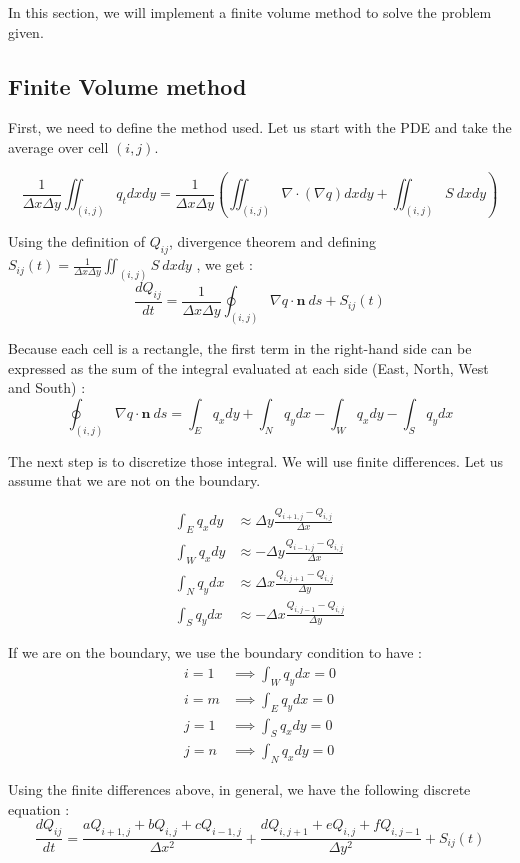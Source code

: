 In this section, we will implement a finite volume method to solve the problem given.

\subsection{Finite Volume method}
First, we need to define the method used. Let us start with the PDE and take the average over cell $(i,j)$.

$$\frac{1}{\Delta x \Delta y}\iint_{(i,j)} q_t dxdy = \frac{1}{\Delta x \Delta y} (\iint_{(i,j)} \nabla \cdot (\nabla q)dxdy + \iint_{(i,j)} S\: dxdy) $$

Using the definition of $Q_{ij}$, divergence theorem and defining $S_{ij}(t) =\frac{1}{\Delta x \Delta y}\iint_{(i,j)} S\: dxdy$ , we get :
$$\frac{dQ_{ij}}{dt} = \frac{1}{\Delta x \Delta y}\oint_{(i,j)} \nabla q \cdot \textbf{n}\: ds + S_{ij}(t)$$

Because each cell is a rectangle, the first term in the right-hand side can be expressed as the sum of the integral evaluated at each side (East, North, West and South) : 
$$\oint_{(i,j)} \nabla q \cdot \textbf{n}\: ds = \int_E q_x dy+\int_N q_ydx-\int_Wq_xdy-\int_Sq_ydx$$

The next step is to discretize those integral. We will use finite differences. Let us assume that we are not on the boundary.

\begin{align*}
\int_E q_xdy &\approx \Delta y \frac{Q_{i+1,j}-Q_{i,j}}{\Delta x}\\
\int_W q_xdy &\approx -\Delta y \frac{Q_{i-1,j}-Q_{i,j}}{\Delta x}\\
\int_N q_ydx &\approx \Delta x \frac{Q_{i,j+1}-Q_{i,j}}{\Delta y}\\
\int_S q_ydx &\approx -\Delta x \frac{Q_{i,j-1}-Q_{i,j}}{\Delta y}
\end{align*}

If we are on the boundary, we use the boundary condition to have : 
\begin{align*}
i=1 &\implies \int_W q_ydx = 0\\
i=m &\implies \int_E q_ydx = 0\\
j=1 &\implies \int_S q_xdy = 0\\
j=n &\implies \int_N q_xdy = 0
\end{align*}

Using the finite differences above, in general, we have the following discrete equation : 
$$\frac{dQ_{ij}}{dt} = \frac{aQ_{i+1,j}+bQ_{i,j}+cQ_{i-1,j}}{\Delta x^2}+\frac{dQ_{i,j+1}+eQ_{i,j}+fQ_{i,j-1}}{\Delta y^2}+S_{ij}(t)$$

